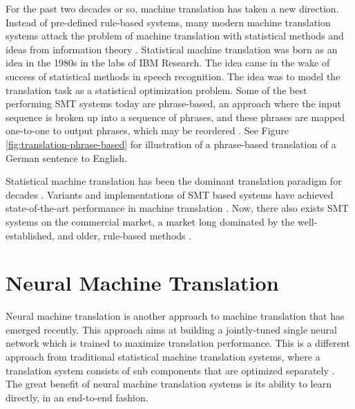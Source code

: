 For the past two decades or so, machine translation has taken a new direction. Instead of pre-defined rule-based systems, many modern machine translation systems attack the problem of machine translation with statistical methods and ideas from information theory \citep{brown1990statistical}. Statistical machine translation was born as an idea in the 1980s in the labs of IBM Research. The idea came in the wake of success of statistical methods in speech recognition. The idea was to model the translation task as a statistical optimization problem. Some of the best performing SMT systems today are phrase-based, an approach where the input sequence is broken up into a sequence of phrases, and these phrases are mapped one-to-one to output phrases, which may be reordered \citep{koehn2010statistical}. See Figure \ref{fig:translation-phrase-based} for illustration of a phrase-based translation of a German sentence to English.

Statistical machine translation has been the dominant translation paradigm for decades \citep{wu2016google}. Variants and implementations of SMT based systems have achieved state-of-the-art performance in machine translation \citep{watanabe07onlinelargemargin}. Now, there also exists SMT systems on the commercial market, a market long dominated by the well-established, and older, rule-based methods \citep{hutchins2007machine}.


\section{Neural Machine Translation}
\label{sec:neural_machine_translation}
Neural machine translation is another approach to machine translation that has emerged recently. This approach aims at building a jointly-tuned single neural network which is trained to maximize translation performance. This is a different approach from traditional statistical machine translation systems, where a translation system consists of sub components that are optimized separately \citep{wolk2015neural}. The great benefit of neural machine translation systems is its ability to learn directly, in an end-to-end fashion. 

